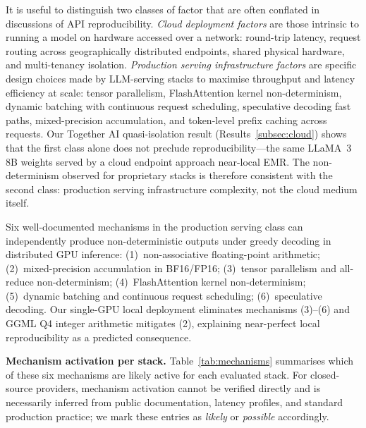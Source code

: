 \documentclass[sn-nature]{sn-jnl}
\begin{document}
It is useful to distinguish two classes of factor that are often conflated in discussions of API reproducibility.
\emph{Cloud deployment factors} are those intrinsic to running a model on hardware accessed over a network: round-trip latency, request routing across geographically distributed endpoints, shared physical hardware, and multi-tenancy isolation.
\emph{Production serving infrastructure factors} are specific design choices made by LLM-serving stacks to maximise throughput and latency efficiency at scale: tensor parallelism, FlashAttention kernel non-determinism, dynamic batching with continuous request scheduling, speculative decoding fast paths, mixed-precision accumulation, and token-level prefix caching across requests.
Our Together AI quasi-isolation result (Results~\ref{subsec:cloud}) shows that the first class alone does not preclude reproducibility---the same LLaMA~3 8B weights served by a cloud endpoint approach near-local EMR.
The non-determinism observed for proprietary stacks is therefore consistent with the second class: production serving infrastructure complexity, not the cloud medium itself.

Six well-documented mechanisms in the production serving class can independently produce non-deterministic outputs under greedy decoding in distributed GPU inference:
(1)~non-associative floating-point arithmetic\cite{higham2002accuracy};
(2)~mixed-precision accumulation in BF16/FP16\cite{yuan2025nondeterminism};
(3)~tensor parallelism and all-reduce non-determinism\cite{shoeybi2019megatron};
(4)~FlashAttention kernel non-determinism\cite{dao2022flashattention};
(5)~dynamic batching and continuous request scheduling\cite{kwon2023vllm};
(6)~speculative decoding\cite{leviathan2023speculative}.
Our single-GPU local deployment eliminates mechanisms (3)--(6) and GGML Q4 integer arithmetic mitigates (2), explaining near-perfect local reproducibility as a predicted consequence.

\textbf{Mechanism activation per stack.}
Table~\ref{tab:mechanisms} summarises which of these six mechanisms are likely active for each evaluated stack.
For closed-source providers, mechanism activation cannot be verified directly and is necessarily inferred from public documentation, latency profiles, and standard production practice; we mark these entries as \emph{likely} or \emph{possible} accordingly.
\end{document}
